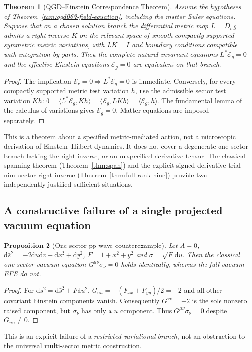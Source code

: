 \documentclass[11pt,a4paper]{article}
\newcommand{\dd}{\mathrm d}
\newtheorem{theorem}{Theorem}[section]
\newtheorem{proposition}[theorem]{Proposition}
\begin{document}
\begin{theorem}[QGD--Einstein Correspondence Theorem]
\label{thm:qgd062-correspondence}
Assume the hypotheses of Theorem~\ref{thm:qgd062-field-equation},
including the matter Euler equations. Suppose that on a chosen
solution branch the differential metric map
$L=D_\sigma g$ admits a right inverse $K$ on the relevant space of
smooth compactly supported symmetric metric variations, with
$LK=I$ and boundary conditions compatible with integration by parts.
Then the complete natural-invariant equations $L^*\mathcal E_g=0$
and the effective Einstein equations $\mathcal E_g=0$ are equivalent
on that branch.
\end{theorem}
\begin{proof}
The implication $\mathcal E_g=0\Rightarrow L^*\mathcal E_g=0$
is immediate. Conversely, for every compactly supported metric
test variation $h$, use the admissible sector test variation $Kh$:
$0=\langle L^*\mathcal E_g,Kh\rangle
=\langle\mathcal E_g,LKh\rangle=\langle\mathcal E_g,h\rangle$.
The fundamental lemma of the calculus of variations gives
$\mathcal E_g=0$. Matter equations are imposed separately.
\end{proof}
\noindent This is a theorem about a specified metric-mediated action,
not a microscopic derivation of Einstein--Hilbert dynamics. It does not
cover a degenerate one-sector branch lacking the right inverse, or
an unspecified derivative tensor. The classical spanning theorem
(Theorem~\ref{thm:span}) and the explicit signed derivative-trial
nine-sector right inverse (Theorem~\ref{thm:full-rank-nine})
provide two independently justified sufficient situations.


\subsection{A constructive failure of a single projected vacuum equation}
\begin{proposition}[One-sector pp-wave counterexample]\label{prop:qgd061-pp-counter}
Let $\Lambda=0$, $\dd\bar s^2=-2\dd u\dd v+\dd x^2+\dd y^2$,
$F=1+x^2+y^2$ and $\sigma=\sqrt F\,\dd u$. Then the classical
one-sector vacuum equation $G^{\mu\nu}\sigma_\nu=0$ holds identically,
whereas the full vacuum EFE do not.
\end{proposition}
\begin{proof}
For $\dd s^2=\dd\bar s^2+F\dd u^2$,
$G_{uu}=-(F_{xx}+F_{yy})/2=-2$ and all other covariant Einstein components
vanish. Consequently $G^{vv}=-2$ is the sole nonzero raised component,
but $\sigma_\nu$ has only a $u$ component. Thus
$G^{\mu\nu}\sigma_\nu=0$ despite $G_{uu}\ne0$.
\end{proof}
This is an explicit failure of a \emph{restricted variational branch},
not an obstruction to the universal multi-sector metric construction.
\end{document}
